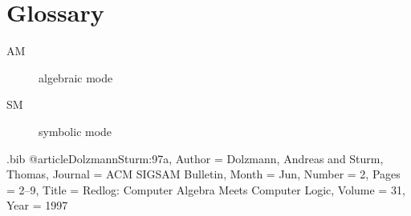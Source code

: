 \documentclass{scrreprt}
\begin{document}
\section*{Glossary}

\begin{description}
\item[AM] algebraic mode
\item[SM] symbolic mode
\end{description}

\printindex[modules]
\printindex[properties]
\printindex[rfunctions]
\printindex[sfunctions]
\printindex[switches]

\begin{filecontents}{\jobname.bib}
  @article{DolzmannSturm:97a,
    Author = {Dolzmann, Andreas and Sturm, Thomas},
    Journal = {ACM SIGSAM Bulletin},
    Month = Jun,
    Number = {2},
    Pages = {2--9},
    Title = {Redlog: Computer Algebra Meets Computer Logic},
    Volume = {31},
    Year = {1997}}
\end{filecontents}
\end{document}
